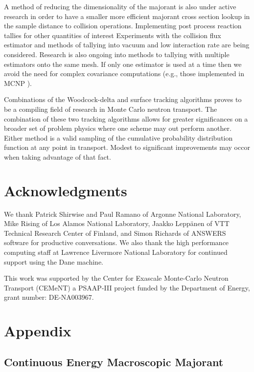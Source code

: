A method of reducing the dimensionality of the majorant is also under active research in order to have a smaller more efficient majorant cross section lookup in the sample distance to collision operations.
Implementing post process reaction tallies for other quantities of interest
Experiments with the collision flux estimator and methods of tallying into vacuum and low interaction rate are being considered.
Research is also ongoing into methods to tallying with multiple estimators onto the same mesh.
If only one estimator is used at a time then we avoid the need for complex covariance computations (e.g., those implemented in MCNP \cite{urbatsch_estimation_1995} \cite{MCNP_RisingArmstrongEtAl}).

Combinations of the Woodcock-delta and surface tracking algorithms proves to be a compiling field of research in Monte Carlo neutron transport.
The combination of these two tracking algorithms allows for greater significances on a broader set of problem physics where one scheme may out perform another.
Either method is a valid sampling of the cumulative probability distribution function at any point in transport.
Modest to significant improvements may occor when taking advantage of that fact.


\section*{Acknowledgments}
We thank Patrick Shirwise and Paul Ramano of Argonne National Laboratory, Mike Rising of Los Alamos National Laboratory, Jaakko Leppänen of VTT Technical Research Center of Finland, and Simon Richards of ANSWERS software for productive conversations.
We also thank the high performance computing staff at Lawrence Livermore National Laboratory for continued support using the Dane machine. 

This work was supported by the Center for Exascale Monte-Carlo Neutron Transport (CEMeNT) a PSAAP-III project funded by the Department of Energy, grant number: DE-NA003967.

\section*{Appendix}


\subsection*{Continuous Energy Macroscopic Majorant}
\label{app:majorant}

